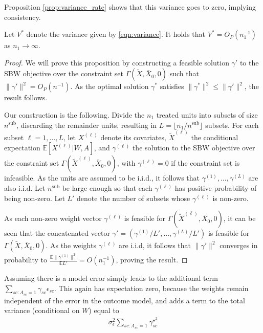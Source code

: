 Proposition \ref{prop:variance_rate} shows that this variance goes to zero, implying consistency. 
\begin{proposition}\label{prop:variance_rate}
Let $V^*$ denote the variance given by \eqref{eqn:variance}. It holds that $V^* = O_P(n_1^{-1})$ as $n_1 \rightarrow \infty$.
\end{proposition}

\begin{proof} We will prove this proposition by constructing a feasible solution $\gamma'$ to the SBW objective over the constraint set $\Gamma(\tilde{X}, \bar{X}_0, 0)$ such that $\|\gamma'\|^2 = O_P(n^{-1})$. As the optimal solution $\gamma^*$ satisfies $\|\gamma^*\|^2 \leq \|\gamma'\|^2$, the result follows.

Our construction is the following. Divide the $n_1$ treated units into subsets of size $n^{\text{sub}}$, discarding the remainder units, resulting in $L = \lfloor n_1/n^{\text{sub}} \rfloor$ subsets. For each subset $\ell=1,\ldots,L$, let $X^{(\ell)}$ denote its covariates, $\tilde{X}^{(\ell)}$ the conditional expectation $\mathbb{E}[X^{(\ell)}|W, A]$, and  $\gamma^{(\ell)}$ the solution to the SBW objective over the constraint set $\Gamma(\tilde{X}^{(\ell)}, \bar{X}_0, 0)$, with $\gamma^{(\ell)}=0$ if the constraint set is infeasible. As the units are assumed to be i.i.d., it follows that $\gamma^{(1)}, \ldots, \gamma^{(L)}$ are also i.i.d. Let $n^{\text{sub}}$ be large enough so that each $\gamma^{(\ell)}$ has positive probability of being non-zero. Let $L'$ denote the number of subsets whose $\gamma^{(\ell)}$ is non-zero.

As each non-zero weight vector $\gamma^{(\ell)}$ is feasible for $\Gamma(\tilde{X}^{(\ell)}, \bar{X}_0, 0)$, it can be seen that the concatenated vector $\gamma' = (\gamma^{(1)}/L', \ldots, \gamma^{(L)}/L')$ is feasible for $\Gamma(\tilde{X},\bar{X}_0,0)$. As the weights $\gamma^{(\ell)}$ are i.i.d, it follows that $\| \gamma'\|^2$ converges in probability to $\frac{\mathbb{E}\|\gamma^{(1)}\|^2}{\mathbb{E}L'} = O(n_1^{-1})$, proving the result.
\end{proof}


\begin{remark}
    Assuming there is a model error simply leads to the additional term $\sum_{sc: A_{sc} = 1}\gamma_{sc}\epsilon_{sc}$. This again has expectation zero, because the weights remain independent of the error in the outcome model, and adds a term to the total variance (conditional on $W$) equal to
    \begin{align*}
    \sigma^2_{\epsilon}\sum_{sc: A_{sc} = 1}\gamma_{sc}^{\star^2}
    \end{align*}
\end{remark}

